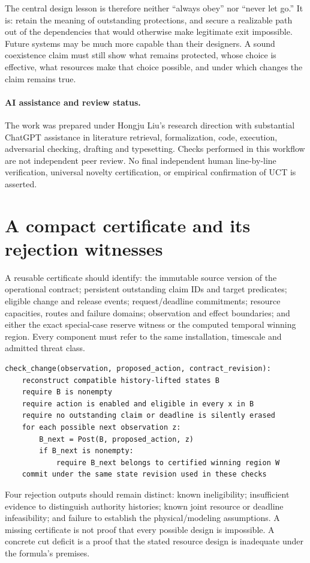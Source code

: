 The central design lesson is therefore neither ``always obey'' nor ``never let go.'' It is: retain the meaning of outstanding protections, and secure a realizable path out of the dependencies that would otherwise make legitimate exit impossible. Future systems may be much more capable than their designers. A sound coexistence claim must still show what remains protected, whose choice is effective, what resources make that choice possible, and under which changes the claim remains true.

\paragraph{AI assistance and review status.}
The work was prepared under Hongju Liu's research direction with substantial ChatGPT assistance in literature retrieval, formalization, code, execution, adversarial checking, drafting and typesetting. Checks performed in this workflow are not independent peer review. No final independent human line-by-line verification, universal novelty certification, or empirical confirmation of UCT is asserted.

\appendix
\section{A compact certificate and its rejection witnesses}
\label{app:certificate}
A reusable certificate should identify: the immutable source version of the operational contract; persistent outstanding claim IDs and target predicates; eligible change and release events; request/deadline commitments; resource capacities, routes and failure domains; observation and effect boundaries; and either the exact special-case reserve witness or the computed temporal winning region. Every component must refer to the same installation, timescale and admitted threat class.

\begin{lstlisting}[caption={Specification-level admission procedure. It is not an oracle for the inputs.}]
check_change(observation, proposed_action, contract_revision):
    reconstruct compatible history-lifted states B
    require B is nonempty
    require action is enabled and eligible in every x in B
    require no outstanding claim or deadline is silently erased
    for each possible next observation z:
        B_next = Post(B, proposed_action, z)
        if B_next is nonempty:
            require B_next belongs to certified winning region W
    commit under the same state revision used in these checks
\end{lstlisting}
Four rejection outputs should remain distinct: known ineligibility; insufficient evidence to distinguish authority histories; known joint resource or deadline infeasibility; and failure to establish the physical/modeling assumptions. A missing certificate is not proof that every possible design is impossible. A concrete cut deficit is a proof that the stated resource design is inadequate under the formula's premises.

